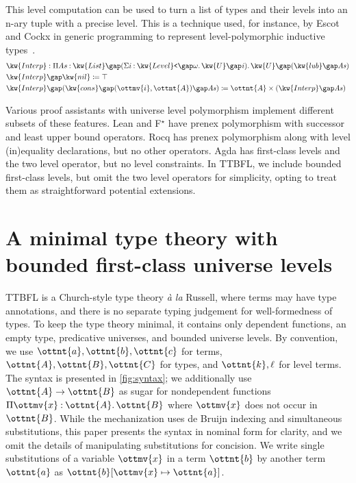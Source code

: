 \documentclass[a4paper,UKenglish,cleveref,autoref,thm-restate]{lipics-v2021}
\makeatletter
\newcommand{\citep}[1]{\cite{#1}}
\newcommand{\lang}{TTBFL\@\xspace}
\newcommand{\ala}{\textit{\`a la}\@\xspace}
\makeatother
\begin{document}
This level computation can be used to turn a list of types and their levels
into an n-ary tuple with a precise level.
This is a technique used, for instance, by Escot and Cockx in generic programming
to represent level-polymorphic inductive types~\citep{generic}.
%
\begin{align*}
   \kw{ Interp }  &:  \Pi  As  \mathbin{:}    \kw{ List }   \gap   (  \Sigma  i  \mathbin{:}   \kw{Level}\texttt{<} \gap   \omega    \mathpunct{.}   \kw{U} \gap   \mathit{ i }    )    \mathpunct{.}   \kw{U} \gap   (   \kw{ lub }   \gap   \mathit{ As }   )    \\
   \kw{ Interp }  &\gap  \kw{ nil }  \coloneqq  \top  \\
   \kw{ Interp }  &\gap  (    \kw{ cons }   \gap   (   \ottmv{i}   ,  \ottnt{A}  )    \gap   \mathit{ As }   )  \coloneqq  \ottnt{A}  \times   (   \kw{ Interp }   \gap   \mathit{ As }   )  
\end{align*}

Various proof assistants with universe level polymorphism implement different subsets of these features.
Lean and F$^\star$ have prenex polymorphism with successor and least upper bound operators.
Rocq has prenex polymorphism along with level (in)equality declarations,
but no other operators.
Agda has first-class levels and the two level operator, but no level constraints.
In \lang, we include bounded first-class levels,
but omit the two level operators for simplicity,
opting to treat them as straightforward potential extensions.

\section{A minimal type theory with bounded first-class universe levels} \label{sec:ttbfl}

\lang is a Church-style type theory \ala Russell,
where terms may have type annotations,
and there is no separate typing judgement for well-formedness of types.
To keep the type theory minimal, it contains only dependent functions,
an empty type, predicative universes, and bounded universe levels.
By convention, we use $\ottnt{a}, \ottnt{b}, \ottnt{c}$ for terms,
$\ottnt{A}, \ottnt{B}, \ottnt{C}$ for types,
and $\ottnt{k}, \ell$ for level terms.
The syntax is presented in \cref{fig:syntax};
we additionally use $ \ottnt{A}  \to  \ottnt{B} $ as sugar for nondependent functions
$ \Pi  \ottmv{x}  \mathbin{:}  \ottnt{A}  \mathpunct{.}  \ottnt{B} $ where $\ottmv{x}$ does not occur in $\ottnt{B}$.
While the mechanization uses de Bruijn indexing and simultaneous substitutions,
this paper presents the syntax in nominal form for clarity,
and we omit the details of manipulating substitutions for concision.
We write single substitutions of a variable $\ottmv{x}$
in a term $\ottnt{b}$ by another term $\ottnt{a}$ as $ \ottnt{b} [  \ottmv{x}  \mapsto  \ottnt{a}  ] $.
\end{document}
